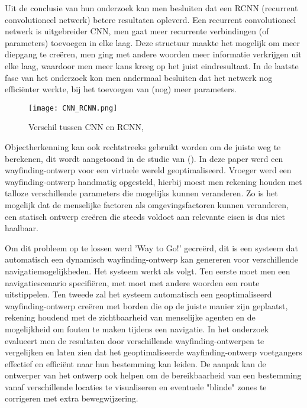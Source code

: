 Uit de conclusie van hun onderzoek kan men besluiten dat een RCNN (recurrent convolutioneel netwerk) betere resultaten opleverd. Een recurrent convolutioneel netwerk is uitgebreider CNN, men gaat meer recurrente verbindingen (of parameters) toevoegen in elke laag. Deze structuur maakte het mogelijk om meer diepgang te creëren, men ging met andere woorden meer informatie verkrijgen uit elke laag, waardoor men meer kans kreeg op het juist eindresultaat. In de laatste fase van het onderzoek kon men andermaal besluiten dat het netwerk nog efficiënter werkte, bij het toevoegen van (nog) meer parameters.

\begin{figure}[H]
	\centering
	\texttt{[image: CNN\_RCNN.png]}
	\caption{Verschil tussen CNN en RCNN, \autocite{Liang2015}}
\end{figure}

Objectherkenning kan ook rechtstreeks gebruikt worden om de juiste weg te berekenen, dit wordt aangetoond in de studie van \textcite{Haikun2017} (). In deze paper werd een wayfinding-ontwerp voor een virtuele wereld geoptimaliseerd. Vroeger werd een wayfinding-ontwerp handmatig opgesteld, hierbij moest men rekening houden met talloze verschillende parameters die mogelijks kunnen veranderen. Zo is het mogelijk dat de menselijke factoren als omgevingsfactoren  kunnen veranderen, een statisch ontwerp creëren die steeds voldoet aan relevante eisen is dus niet haalbaar.

Om dit probleem op te lossen werd 'Way to Go!' gecreërd, dit is een systeem dat automatisch een dynamisch wayfinding-ontwerp kan genereren voor verschillende navigatiemogelijkheden. Het systeem werkt als volgt. Ten eerste moet men een navigatiescenario specifiëren, met moet met andere woorden een route uitstippelen. Ten tweede zal het systeem automatisch een geoptimaliseerd wayfinding-ontwerp creëren met borden die op de juiste manier zijn geplaatst, rekening houdend met de zichtbaarheid van menselijke agenten en de mogelijkheid om fouten te maken tijdens een navigatie.  In het onderzoek evalueert men de resultaten door verschillende wayfinding-ontwerpen te vergelijken en laten zien dat het geoptimaliseerde wayfinding-ontwerp voetgangers effectief en efficiënt naar hun bestemming kan leiden. De aanpak kan de ontwerper van het ontwerp ook helpen om de bereikbaarheid van een bestemming vanaf verschillende locaties te visualiseren en eventuele "blinde" zones te corrigeren met extra bewegwijzering.

